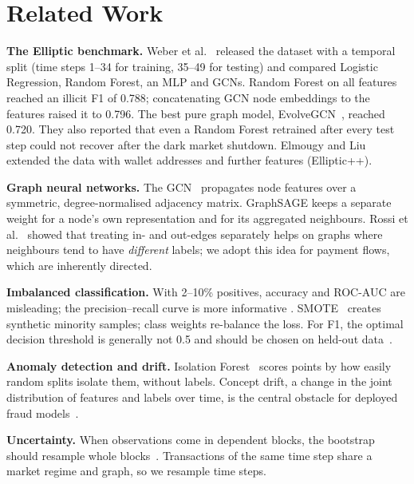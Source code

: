 \section{Related Work}

\textbf{The Elliptic benchmark.} Weber et al.~\cite{weber2019} released the
dataset with a temporal split (time steps 1--34 for training, 35--49 for
testing) and compared Logistic Regression, Random Forest, an MLP and GCNs.
Random Forest on all features reached an illicit F1 of 0.788; concatenating GCN
node embeddings to the features raised it to 0.796. The best pure graph model,
EvolveGCN~\cite{pareja2020}, reached 0.720. They also reported that even a
Random Forest retrained after every test step could not recover after the dark
market shutdown. Elmougy and Liu~\cite{elmougy2023} extended the data with
wallet addresses and further features (Elliptic++).

\textbf{Graph neural networks.} The GCN~\cite{kipf2017} propagates node
features over a symmetric, degree-normalised adjacency matrix. GraphSAGE
\cite{hamilton2017} keeps a separate weight for a node's own representation and
for its aggregated neighbours. Rossi et al.~\cite{rossi2023} showed that
treating in- and out-edges separately helps on graphs where neighbours tend to
have \emph{different} labels; we adopt this idea for payment flows, which are
inherently directed.

\textbf{Imbalanced classification.} With 2--10\% positives, accuracy and ROC-AUC
are misleading; the precision--recall curve is more informative
\cite{saito2015}. SMOTE~\cite{chawla2002} creates synthetic minority samples;
class weights re-balance the loss. For F1, the optimal decision threshold is
generally not 0.5 and should be chosen on held-out data~\cite{lipton2014}.

\textbf{Anomaly detection and drift.} Isolation Forest~\cite{liu2008} scores
points by how easily random splits isolate them, without labels. Concept drift,
a change in the joint distribution of features and labels over time, is the
central obstacle for deployed fraud models~\cite{gama2014}.

\textbf{Uncertainty.} When observations come in dependent blocks, the bootstrap
should resample whole blocks~\cite{kunsch1989}. Transactions of the same time
step share a market regime and graph, so we resample time steps.
